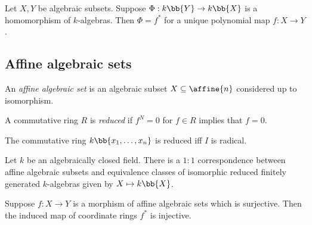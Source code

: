 \documentclass{article}
\begin{document}
\begin{lemma}
  Let $X,Y$ be algebraic subsets. Suppose $\Phi : k\bb{Y}\to k\bb{X}$ is a homomorphism
  of $k$-algebras. Then $\Phi=f^*$ for a unique polynomial map $f:X\to Y$.
\end{lemma}

\subsection{Affine algebraic sets}

\begin{definition}
  An \emph{affine algebraic set} is an algebraic subset $X\subseteq\affine{n}$ considered
  up to isomorphism.
\end{definition}

\begin{definition}
  A commutative ring $R$ is \emph{reduced} if $f^N=0$ for $f\in R$ implies that $f=0$.
\end{definition}

\begin{lemma}
  The commutative ring $k\bb{x_1,\ldots,x_n}$ is reduced iff $I$ is radical.
\end{lemma}

\begin{theorem}
  Let $k$ be an algebraically closed field. There is a $1:1$ correspondence
  between affine algebraic subsets and equivalence classes of isomorphic reduced
  finitely generated $k$-algebras given by $X\mapsto k\bb{X}$.
\end{theorem}

\begin{proposition}
  Suppose $f:X\to Y$ is a morphism of affine algebraic sets which is surjective. Then
  the induced map of coordinate rings $f^*$ is injective.
\end{proposition}
\end{document}
